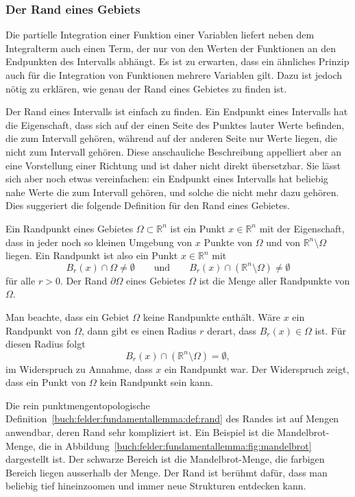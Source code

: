 %
%
\subsubsection{Der Rand eines Gebiets}
Die partielle Integration einer Funktion einer Variablen liefert
neben dem Integralterm auch einen Term, der nur von den Werten der
Funktionen an den Endpunkten des Intervalls abhängt.
Es ist zu erwarten, dass ein ähnliches Prinzip auch für die
Integration von Funktionen mehrere Variablen gilt.
Dazu ist jedoch nötig zu erklären, wie genau der Rand eines
Gebietes zu finden ist.

Der Rand eines Intervalls ist einfach zu finden.
Ein Endpunkt eines Intervalls hat die Eigenschaft, dass sich
auf der einen Seite des Punktes lauter Werte befinden, die zum
Intervall gehören, während auf der anderen Seite nur Werte liegen,
die nicht zum Intervall gehören.
Diese anschauliche Beschreibung appelliert aber an eine Vorstellung
einer Richtung und ist daher nicht direkt übersetzbar.
Sie lässt sich aber noch etwas vereinfachen: ein Endpunkt eines
Intervalls hat beliebig nahe Werte die zum Intervall gehören, und
solche die nicht mehr dazu gehören.
Dies suggeriert die folgende Definition für den Rand eines Gebietes.

\begin{definition}[Rand]
\label{buch:felder:fundamentallemma:def:rand}
Ein Randpunkt eines Gebietes $\Omega\subset\mathbb{R}^n$ ist ein Punkt
$x\in\mathbb{R}^n$ mit der Eigenschaft, dass in jeder noch so kleinen 
Umgebung von $x$ Punkte von $\Omega$ und von $\mathbb{R}^n\setminus\Omega$
liegen.
Ein Randpunkt ist also ein Punkt $x\in\mathbb{R}^n$ mit
\[
B_r(x)\cap \Omega\ne \emptyset
\qquad\text{und}\qquad
B_r(x)\cap (\mathbb{R}^n\setminus \Omega)
\ne \emptyset
\]
für alle $r>0$.
Der Rand $\partial \Omega$ eines Gebietes $\Omega$ ist die Menge
aller Randpunkte von $\Omega$.
\end{definition}

Man beachte, dass ein Gebiet $\Omega$ keine Randpunkte enthält.
Wäre $x$ ein Randpunkt von $\Omega$, dann gibt es einen Radius $r$
derart, dass $B_r(x)\in\Omega$ ist.
Für diesen Radius folgt
\[
B_r(x)\cap (\mathbb{R}^n\setminus\Omega)
=
\emptyset,
\]
im Widerspruch zu Annahme, dass $x$ ein Randpunkt war.
Der Widerspruch zeigt, dass ein Punkt von $\Omega$ kein Randpunkt
sein kann.

Die rein punktmengentopologische 
%
Definition~\ref{buch:felder:fundamentallemma:def:rand} des Randes ist
auf Mengen anwendbar, deren Rand sehr kompliziert ist.
Ein Beispiel ist die Mandelbrot-Menge, die in
Abbildung~\ref{buch:felder:fundamentallemma:fig:mandelbrot}
dargestellt ist.
Der schwarze Bereich ist die Mandelbrot-Menge, die farbigen Bereich
liegen ausserhalb der Menge.
Der Rand ist berühmt dafür, dass man beliebig tief hineinzoomen
und immer neue Strukturen entdecken kann.




